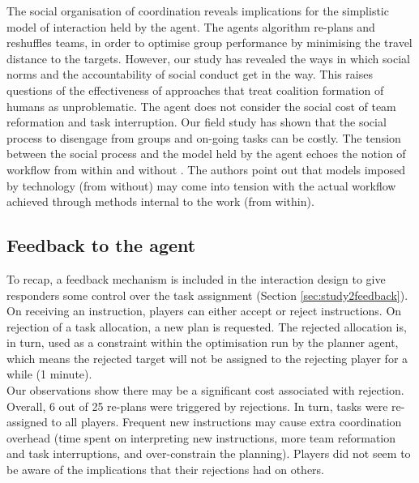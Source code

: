 The social organisation of coordination reveals implications for the simplistic model of interaction held by the agent. The agents algorithm re-plans and reshuffles teams, in order to optimise group performance by minimising the travel distance to the targets. However, our study has revealed the ways in which social norms and the accountability of social conduct get in the way. This raises questions of the effectiveness of approaches that treat coalition formation of humans as unproblematic. The agent does not consider the social cost of team reformation and task interruption. Our field study has shown that the social process to disengage from groups and on-going tasks can be costly. The tension between the social process and the model held by the agent echoes the notion of workflow from within and without \cite{Bowers1994}. The authors point out that models imposed by technology (from without) may come into tension with the actual workflow achieved through methods internal to the work (from within). 



\subsection{Feedback to the agent}\label{sec:studytwofeedback}

To recap, a feedback mechanism is included in the interaction design to give responders some control over the task assignment (Section \ref{sec:study2feedback}). On receiving an instruction, players can either accept or reject instructions. On rejection of a task allocation, a new plan is requested. The rejected allocation is, in turn, used as a constraint within the optimisation run by the planner agent, which means the rejected target will not be assigned to the rejecting player for a while (1 minute). \\

Our observations show there may be a significant cost associated with rejection. Overall, 6 out of 25 re-plans were triggered by rejections. In turn, tasks were re-assigned to all players. Frequent new instructions may cause extra coordination overhead (time spent on interpreting new instructions, more team reformation and task interruptions, and over-constrain the planning). Players did not seem to be aware of the implications that their rejections had on others.\\
 
